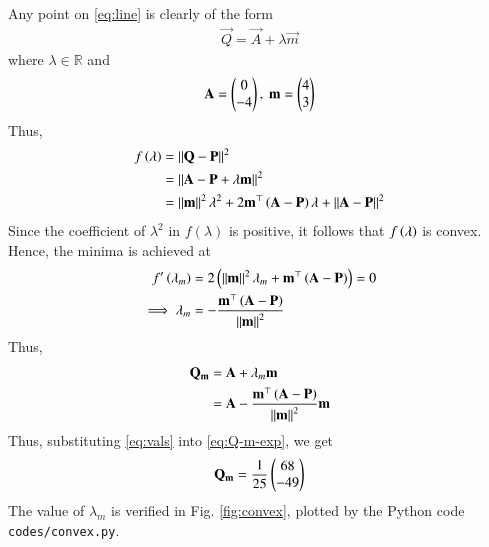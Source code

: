 \documentclass[journal,12pt,twocolumn]{IEEEtran}
\begin{document}
\begin{enumerate}
    \solution Any point on \eqref{eq:line} is clearly of the form
    \begin{align}
        \vec{Q} = \vec{A} + \lambda\vec{m}
        \label{eq:Q-def}
    \end{align}
    where $\lambda \in \mathbb{R}$ and
    \begin{align}
        \mathbf{A} = \begin{pmatrix}0\\-4\end{pmatrix},\ \mathbf{m} = \begin{pmatrix}4\\3\end{pmatrix}
        \label{eq:vals}
    \end{align}
    Thus,
    \begin{align}
        f\left(\lambda\right) &= \left\lVert\mathbf{Q}-\mathbf{P}\right\rVert^2 \\
                        &= \left\lVert\mathbf{A}-\mathbf{P}+\lambda\mathbf{m}\right\rVert^2 \\
                        &= \left\lVert\mathbf{m}\right\rVert^2\lambda^2 + 2\mathbf{m}^\top\left(\mathbf{A}-\mathbf{P}\right)\lambda + \left\lVert\mathbf{A}-\mathbf{P}\right\rVert^2
                        \label{eq:dist-lambda}
    \end{align}
    Since the coefficient of $\lambda^2$ in $f(\lambda)$ is positive, it
    follows that $f\left(\lambda\right)$ is convex. Hence, the minima is achieved at
    \begin{align}
        f'\left(\lambda_m\right) &= 2\left(\left\lVert\mathbf{m}\right\rVert^2\lambda_m + \mathbf{m}^\top\left(\mathbf{A}-\mathbf{P}\right)\right) = 0 \\
        \implies \lambda_m &= -\frac{\mathbf{m}^\top\left(\mathbf{A}-\mathbf{P}\right)}{\left\lVert\mathbf{m}\right\rVert^2}
        \label{eq:lambda-min}
    \end{align}
    Thus,
    \begin{align}
        \mathbf{Q_m} &= \mathbf{A} + \lambda_m\mathbf{m} \\
                  &= \mathbf{A} - \frac{\mathbf{m}^\top\left(\mathbf{A}-\mathbf{P}\right)}{\left\lVert\mathbf{m}\right\rVert^2}\mathbf{m}
                  \label{eq:Q-m-exp}
    \end{align}
    Thus, substituting \eqref{eq:vals} into \eqref{eq:Q-m-exp}, we get
    \begin{align}
        \mathbf{Q_m} = \frac{1}{25}\begin{pmatrix}68\\-49\end{pmatrix}
        \label{eq:Q-sol}
    \end{align}
    The value of $\lambda_m$ is verified in Fig. \ref{fig:convex}, 
    plotted by the Python code \texttt{codes/convex.py}.
    \begin{figure}[!ht]
        \centering

\end{figure}
\end{enumerate}
\end{document}
